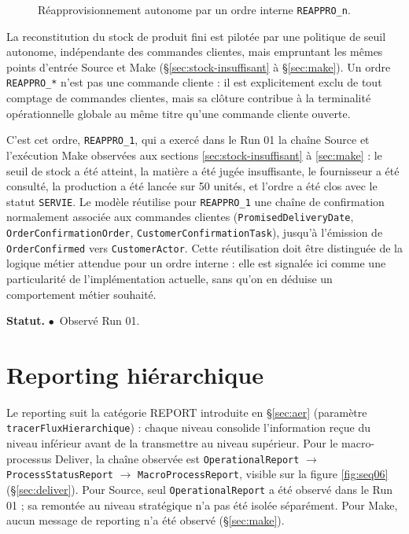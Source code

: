 \documentclass[11pt,a4paper]{article}
\newcommand{\code}[1]{\texttt{#1}}
\newcommand{\stRUN}{\ensuremath{\bullet}~Observé Run 01}
\newcommand{\statut}[1]{\textbf{Statut.} #1}
\begin{document}
\begin{figure}[H]
\centering

\caption{Réapprovisionnement autonome par un ordre interne \code{REAPPRO\_n}.}
\label{fig:act06}
\end{figure}

La reconstitution du stock de produit fini est pilotée par une politique de seuil autonome, indépendante des commandes clientes, mais empruntant les mêmes points d'entrée Source et Make (\S\ref{sec:stock-insuffisant} à \S\ref{sec:make}). Un ordre \code{REAPPRO\_*} n'est pas une commande cliente : il est explicitement exclu de tout comptage de commandes clientes, mais sa clôture contribue à la terminalité opérationnelle globale au même titre qu'une commande cliente ouverte.

C'est cet ordre, \code{REAPPRO\_1}, qui a exercé dans le Run 01 la chaîne Source et l'exécution Make observées aux sections \ref{sec:stock-insuffisant} à \ref{sec:make} : le seuil de stock a été atteint, la matière a été jugée insuffisante, le fournisseur a été consulté, la production a été lancée sur 50 unités, et l'ordre a été clos avec le statut \code{SERVIE}. Le modèle réutilise pour \code{REAPPRO\_1} une chaîne de confirmation normalement associée aux commandes clientes (\code{PromisedDeliveryDate}, \code{OrderConfirmationOrder}, \code{CustomerConfirmationTask}), jusqu'à l'émission de \code{OrderConfirmed} vers \code{CustomerActor}. Cette réutilisation doit être distinguée de la logique métier attendue pour un ordre interne : elle est signalée ici comme une particularité de l'implémentation actuelle, sans qu'on en déduise un comportement métier souhaité.

\statut{\stRUN.}

\section{Reporting hiérarchique}
\label{sec:reporting}

Le reporting suit la catégorie REPORT introduite en \S\ref{sec:aer} (paramètre \code{tracerFluxHierarchique}) : chaque niveau consolide l'information reçue du niveau inférieur avant de la transmettre au niveau supérieur. Pour le macro-processus Deliver, la chaîne observée est \code{OperationalReport} $\to$ \code{ProcessStatusReport} $\to$ \code{MacroProcessReport}, visible sur la figure \ref{fig:seq06} (\S\ref{sec:deliver}). Pour Source, seul \code{OperationalReport} a été observé dans le Run 01 ; sa remontée au niveau stratégique n'a pas été isolée séparément. Pour Make, aucun message de reporting n'a été observé (\S\ref{sec:make}).
\end{document}
